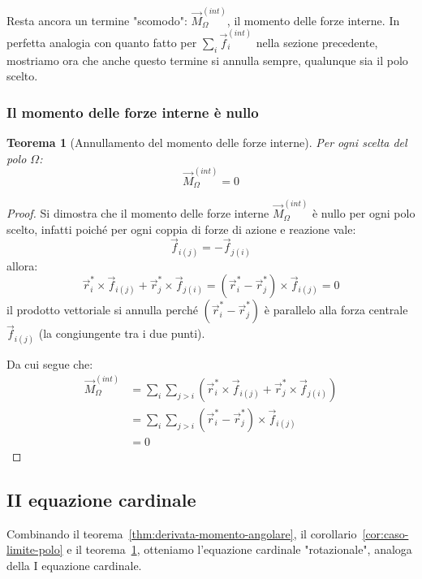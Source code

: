 \documentclass[11pt, a4paper, openright]{book}
\theoremstyle{plain}
\newtheorem{theorem}{Teorema}[section]
\theoremstyle{definition}
\begin{document}
Resta ancora un termine "scomodo": $\vec{M}_\Omega^{(int)}$, il momento
delle forze interne. In perfetta analogia con quanto fatto per
$\sum_i \vec{f}_i^{(int)}$ nella sezione precedente, mostriamo ora che
anche questo termine si annulla sempre, qualunque sia il polo scelto.

\subsubsection{Il momento delle forze interne è nullo}
\label{subsubsec:momento-interno-nullo}

\begin{theorem}[Annullamento del momento delle forze interne]
\label{thm:momento-interno-nullo}
Per ogni scelta del polo $\Omega$:
\[\vec{M}_\Omega^{(int)} = 0\]
\end{theorem}

\begin{proof}
Si dimostra che il momento delle forze interne $\vec{M}_\Omega^{(int)}$
è nullo per ogni polo scelto, infatti poiché per ogni coppia di forze
di azione e reazione vale:
\[\vec{f}_{i(j)} = -\vec{f}_{j(i)}\]
allora:
\begin{equation}
    \vec{r}_i^* \times \vec{f}_{i(j)} + \vec{r}_j^* \times \vec{f}_{j(i)} = (\vec{r}_i^* - \vec{r}_j^*) \times \vec{f}_{i(j)} = 0
\end{equation}
il prodotto vettoriale si annulla perché $(\vec{r}_i^*-\vec{r}_j^*)$ è parallelo alla forza centrale $\vec{f}_{i(j)}$ (la congiungente tra i due punti).

Da cui segue che:
\begin{align}
    \vec{M}_\Omega^{(int)} & = \sum_i\sum_{j > i} (\vec{r}_i^* \times \vec{f}_{i(j)} + \vec{r}_j^* \times \vec{f}_{j(i)}) \\
    & = \sum_i\sum_{j > i} (\vec{r}_i^* - \vec{r}_j^*) \times \vec{f}_{i(j)} \\
    & = 0
\end{align}
\end{proof}

\subsection{II equazione cardinale}
\label{subsec:II-cardinale}

Combinando il teorema~\ref{thm:derivata-momento-angolare}, il
corollario~\ref{cor:caso-limite-polo} e il
teorema~\ref{thm:momento-interno-nullo}, otteniamo l'equazione cardinale
"rotazionale", analoga della I equazione cardinale.
\end{document}
